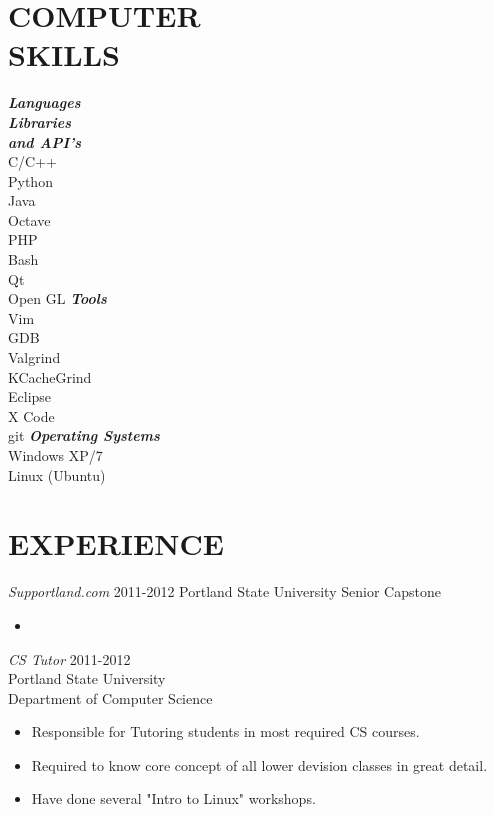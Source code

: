 \documentclass[margin]{res}
\begin{document}
\begin{resume}
\section{COMPUTER \\ SKILLS}	\begin{multicols}{3}
									{\sl \textbf{Languages \\ Libraries \\ and API's}} \\
									C/C++ \\ Python \\ Java \\ Octave \\ PHP \\  
							        Bash \\ Qt \\ Open GL %
									\vfill
									\columnbreak
									{\sl \textbf{Tools}} \\
							 		Vim \\ GDB\\ Valgrind \\ KCacheGrind\\ Eclipse\\ X Code \\ git
									\vfill
									\columnbreak
			                		{\sl \textbf{Operating Systems}} \\ Windows XP/7 \\ Linux (Ubuntu)
								\end{multicols}

\section{EXPERIENCE}
				{\sl Supportland.com} \hfill 2011-2012
				Portland State University Senior Capstone
				\begin{itemize} \itemsep -2pt
					\item
				\end{itemize}
				
				{\sl CS Tutor} \hfill 2011-2012 \\ 
				Portland State University \\
				Department of Computer Science
				\begin{itemize}	\itemsep -2pt
					\item	Responsible for Tutoring students in most required CS courses.
					\item	Required to know core concept of all lower devision classes in great detail.
					\item	Have done several "Intro to Linux" workshops.
				\end{itemize}
 				

\end{resume}
\end{document}
